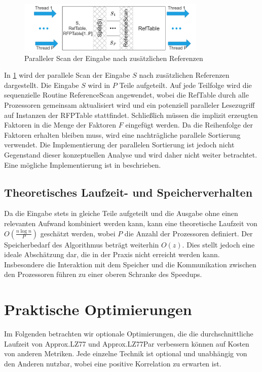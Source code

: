 \begin{figure}[ht]
    \centering
    \includegraphics[width=0.8\textwidth]{Images/parallel_referencescan.png}
    \caption{Paralleler Scan der Eingabe nach zusätzlichen Referenzen}
    \label{fig:parrefscan}
\end{figure}
In \ref{fig:parrefscan} wird der parallele Scan der Eingabe $S$ nach zusätzlichen Referenzen dargestellt. Die Eingabe $S$ wird in $P$ Teile aufgeteilt. Auf jede Teilfolge wird die sequenzielle Routine
ReferenceScan angewendet, wobei die RefTable durch alle Prozessoren gemeinsam aktualisiert wird und ein potenziell paralleler Lesezugriff auf Instanzen der RFPTable stattfindet. 
Schließlich müssen die implizit erzeugten Faktoren in die Menge der Faktoren $F$ eingefügt werden. Da die Reihenfolge der Faktoren erhalten bleiben muss, wird eine nachträgliche parallele Sortierung
verwendet. Die Implementierung der parallelen Sortierung ist jedoch nicht Gegenstand dieser konzeptuellen Analyse und wird daher nicht weiter betrachtet. Eine mögliche Implementierung ist in \cite{parallelcomputing} 
beschrieben.

\subsection{Theoretisches Laufzeit- und Speicherverhalten}
Da die Eingabe stets in gleiche Teile aufgeteilt und die Ausgabe ohne einen relevanten Aufwand kombiniert werden kann, kann eine theoretische Laufzeit von $O(\frac{n \log n}{P})$ geschätzt werden, 
wobei $P$ die Anzahl der Prozessoren definiert. Der Speicherbedarf des Algorithmus beträgt weiterhin $O(z)$. Dies stellt jedoch eine
ideale Abschätzung dar, die in der Praxis nicht erreicht werden kann. Insbesondere die Interaktion mit dem Speicher und die Kommunikation zwischen den Prozessoren führen zu einer oberen Schranke
des Speedups.

\section{Praktische Optimierungen} \label{sec:practopt}
Im Folgenden betrachten wir optionale Optimierungen, die die durchschnittliche Laufzeit von Approx.LZ77 und Approx.LZ77Par verbessern können auf Kosten von anderen Metriken. Jede einzelne Technik
ist optional und unabhängig von den Anderen nutzbar, wobei eine positive Korrelation zu erwarten ist.

